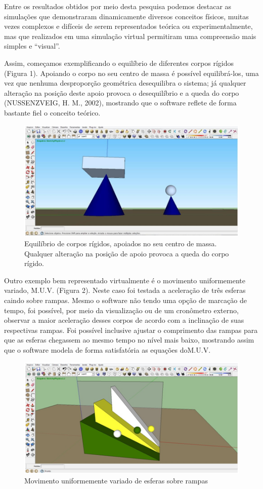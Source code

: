 \documentclass[article,12pt,onesidea,4paper,english,brazil]{abntex2}
\begin{document}
Entre os resultados obtidos por meio desta pesquisa podemos destacar as simulações que demonstraram dinamicamente diversos conceitos físicos, muitas vezes complexos e difíceis de serem representados teórica ou experimentalmente, mas que realizados em uma simulação virtual permitiram uma compreensão mais simples e “visual”. 

Assim, começamos exemplificando o equilíbrio de diferentes corpos rígidos (Figura 1). Apoiando o corpo no seu centro de massa é possível equilibrá-los, uma vez que nenhuma desproporção geométrica desequilibra o sistema; já qualquer alteração na posição deste apoio provoca o desequilíbrio e a queda do corpo (NUSSENZVEIG, H. M., 2002), mostrando que o software reflete de forma bastante fiel o conceito teórico.
\begin{figure}[h]
	\centering
	\includegraphics[width=0.7\linewidth]{pip-pg70-01}
	\caption{Equilíbrio de corpos rígidos, apoiados no seu centro de massa. Qualquer alteração na posição de apoio provoca a queda do corpo rígido.}
	\label{fig:pip-pg70-01}
\end{figure}

Outro exemplo bem representado virtualmente é o movimento uniformemente variado, M.U.V. (Figura 2). Neste caso foi testada a aceleração de três esferas caindo sobre rampas. Mesmo o software não tendo uma opção de marcação de tempo, foi possível, por meio da visualização ou de um cronômetro externo, observar a maior aceleração desses corpos de acordo com a inclinação de suas respectivas rampas. Foi possível inclusive ajustar o comprimento das rampas para que as esferas chegassem ao mesmo tempo no nível mais baixo, mostrando assim que o software modela de forma satisfatória as equações doM.U.V.
\begin{figure}[h]
	\centering
	\includegraphics[width=0.5\linewidth]{pip-pg70-02}
	\caption{Movimento uniformemente variado de esferas sobre rampas}
	\label{fig:pip-pg70-02}
\end{figure}
\end{document}
